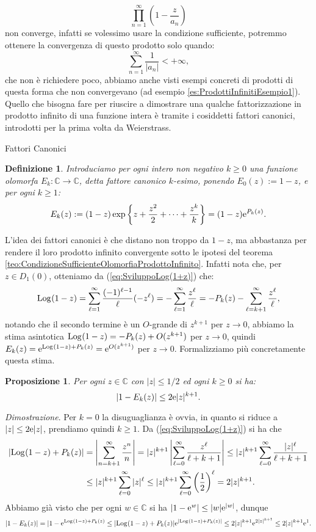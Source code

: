\documentclass[11pt]{book}
\makeatletter
\theoremstyle{Definizione}
\newtheorem*{mydef}{Definizione}
\theoremstyle{TeoremaProposizioneLemmaCorollarioCongettura}
\newtheorem{mypropo}[myteo]{Proposizione}
\theoremstyle{OsservazioneNotaEsempio}
\renewenvironment{proof}[1][\proofname]{\par
  \normalfont \topsep6\p@\@plus6\p@\relax
  \trivlist
  \item[\hskip\labelsep
        \itshape
    #1\@addpunct{.}]\ignorespaces
}{%
  \endtrivlist\@endpefalse
}
\renewenvironment{proof}{\textsl{Dimostrazione}.}{}
\newcommand{\C}{\mathbb{C}}
\newcommand{\Disc}[3][]{D^{#1}_{{#2}}({#3})}
\newcommand{\e}{\textup{e}}
\newcommand{\Log}[1][]{\textup{Log}_{#1}}
\makeatother
\begin{document}
$$
\prod_{n = 1}^\infty \left(1-\frac{z}{a_n}\right)
$$
non converge, infatti se volessimo usare la condizione sufficiente, potremmo ottenere la convergenza di questo prodotto solo quando:
$$
\sum_{n = 1}^\infty \frac{1}{|a_n|} < +\infty,
$$
che non è richiedere poco, abbiamo anche visti esempi concreti di prodotti di questa forma che non convergevano (ad esempio \ref{es:ProdottiInfinitiEsempio1}).\\
Quello che bisogna fare per riuscire a dimostrare una qualche fattorizzazione in prodotto infinito di una funzione intera è tramite i cosiddetti fattori canonici, introdotti per la prima volta da Weierstrass.
\begin{boxdef}{Fattori Canonici}
\begin{mydef}
Introduciamo per ogni intero non negativo $k\geq 0$ una funzione olomorfa $E_k:\C \longrightarrow \C$, detta fattore canonico $k$-esimo, ponendo $E_0(z) := 1-z$, e per ogni $k \geq 1$:
$$
E_k(z) := (1-z)\exp\left\{z+\frac{z^2}{2}+\cdots + \frac{z^k}{k}\right\} = (1-z)\e^{P_k(z)}.
$$
\end{mydef}
\end{boxdef}
\noindent
L'idea dei fattori canonici è che distano non troppo da $1-z$, ma abbastanza per rendere il loro prodotto infinito convergente sotto le ipotesi del teorema \ref{teo:CondizioneSufficienteOlomorfiaProdottoInfinito}. Infatti nota che, per $z\in \Disc{1}{0}$, otteniamo da (\ref{eq:SviluppoLog(1+z)}) che:
$$
\Log(1-z) = \sum_{\ell= 1}^\infty \frac{(-1)^{\ell-1}}{\ell}(-z^\ell) = -\sum_{\ell = 1}^\infty \frac{z^{\ell}}{\ell} = -P_k(z) -\sum_{\ell = k+1}^\infty \frac{z^{\ell}}{\ell},
$$
notando che il secondo termine è un $O$-grande di $z^{k+1}$ per $z \to 0$, abbiamo la stima asintotica  $\Log(1-z) = -P_k(z) +O(z^{k+1})$ per $z \to 0$, quindi $E_k(z) = \e^{\Log(1-z)+P_k(z)} = \e^{O(z^{k+1})}$ per $z\to 0$. Formalizziamo più concretamente questa stima.
\begin{boxpro}
\begin{mypropo}\label{pro:StimaFattoreCanonico}
Per ogni $z\in \C$ con $|z|\leq 1/2$ ed ogni $k\geq 0$ si ha:
$$
|1-E_k(z)| \leq 2\e |z|^{k+1}.
$$
\end{mypropo}
\tcblower
\begin{proof}
Per $k = 0$ la disuguaglianza è ovvia, in quanto si riduce a $|z|\leq 2\e |z|$, prendiamo quindi $k \geq 1$. Da (\ref{eq:SviluppoLog(1+z)}) si ha che
\begin{align*}
|\Log(1-z)+P_k(z)| &= \left|\sum_{n = k+1}^\infty \frac{z^n}{n}\right| = |z|^{k+1}\left|\sum_{\ell = 0}^{\infty} \frac{z^{\ell}}{\ell+k+1}\right|  \leq |z|^{k+1}\sum_{\ell = 0}^{\infty} \frac{|z|^{\ell}}{\ell+k+1} \\
&\leq |z|^{k+1}\sum_{\ell = 0}^\infty |z|^\ell \leq |z|^{k+1} \sum_{\ell = 0}^\infty \left(\frac{1}{2}\right)^\ell = 2|z|^{k+1}.
\end{align*}
Abbiamo già visto che per ogni $w\in \C$ si ha $|1-\e^{w}| \leq |w| \e^{|w|}$, dunque
$$
|1-E_k(z)| = |1-\e^{\Log(1-z)+P_k(z)} \leq |\Log(1-z)+P_k(z)|\e^{|\Log(1-z)+P_k(z)|} \leq 2|z|^{k+1} \e^{2|z|^{k+1}} \leq 2|z|^{k+1}\e^{1}.
$$
\end{proof}
\end{boxpro}
\end{document}

